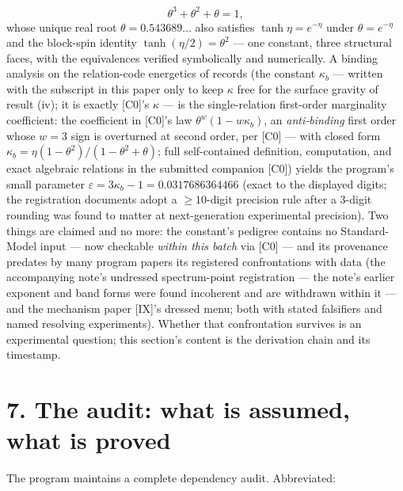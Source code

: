 \documentclass[11pt]{article}
\begin{document}
\[
\theta^3 + \theta^2 + \theta = 1,
\]
whose unique real root $\theta = 0.543689\ldots$ also satisfies $\tanh\eta = e^{-\eta}$ under $\theta = e^{-\eta}$ and the block-spin identity $\tanh(\eta/2) = \theta^2$ — one constant, three structural faces, with the equivalences verified symbolically and numerically.  A binding analysis on the relation-code energetics of records (the constant $\kappa_b$ — written with the subscript in this paper only to keep $\kappa$ free for the surface gravity of result (iv); it is exactly [C0]'s $\kappa$ — is the single-relation first-order marginality coefficient: the coefficient in [C0]'s law $\theta^w(1 - w\kappa_b)$, an \emph{anti-binding} first order whose $w = 3$ sign is overturned at second order, per [C0] — with closed form $\kappa_b = \eta(1-\theta^2)/(1-\theta^2+\theta)$; full self-contained definition, computation, and exact algebraic relations in the submitted companion [C0]) yields the program's small parameter $\varepsilon = 3\kappa_b - 1 = 0.0317686364466$ (exact to the displayed digits; the registration documents adopt a $\ge 10$-digit precision rule after a 3-digit rounding was found to matter at next-generation experimental precision).  Two things are claimed and no more: the constant's pedigree contains no Standard-Model input — now checkable \emph{within this batch} via [C0] — and its provenance predates by many program papers its registered confrontations with data (the accompanying note's undressed spectrum-point registration — the note's earlier exponent and band forms were found incoherent and are withdrawn within it — and the mechanism paper [IX]'s dressed menu; both with stated falsifiers and named resolving experiments).  Whether that confrontation survives is an experimental question; this section's content is the derivation chain and its timestamp.

\section*{7. The audit: what is assumed, what is proved}
The program maintains a complete dependency audit.  Abbreviated:
\end{document}
